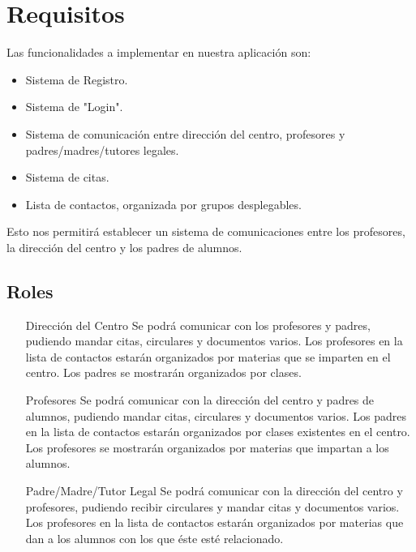 %
%
%
%

\cleardoublepage
\chapter{Requisitos}
\label{chap:requirements}

Las funcionalidades a implementar en nuestra aplicaci\'on son:
\begin{itemize}
	\item Sistema de Registro.
	\item Sistema de "Login".
	\item Sistema de comunicaci\'on entre direcci\'on del centro, profesores y padres/madres/tutores legales.
	\item Sistema de citas.
	\item Lista de contactos, organizada por grupos desplegables.
\end{itemize}

Esto nos permitir\'a establecer un sistema de comunicaciones entre los profesores, la direcci\'on del centro y los padres de alumnos.

\section{Roles}

	\begin{itemize}
		\item[Direcci\'on del Centro] Se podr\'a comunicar con los profesores y padres, pudiendo mandar citas, circulares y documentos varios. Los profesores en la lista de contactos estar\'an organizados por materias que se imparten en el centro. Los padres se mostrar\'an organizados por clases.
		\item[Profesores] Se podr\'a comunicar con la direcci\'on del centro y padres de alumnos, pudiendo mandar citas, circulares y documentos varios. Los padres en la lista de contactos estar\'an organizados por clases existentes en el centro. Los profesores se mostrar\'an organizados por materias que impartan a los alumnos.
		\item[Padre/Madre/Tutor Legal] Se podr\'a comunicar con la direcci\'on del centro y profesores, pudiendo recibir circulares y mandar citas y documentos varios. Los profesores en la lista de contactos estar\'an organizados por materias que dan a los alumnos con los que \'este est\'e relacionado.
	\end{itemize}